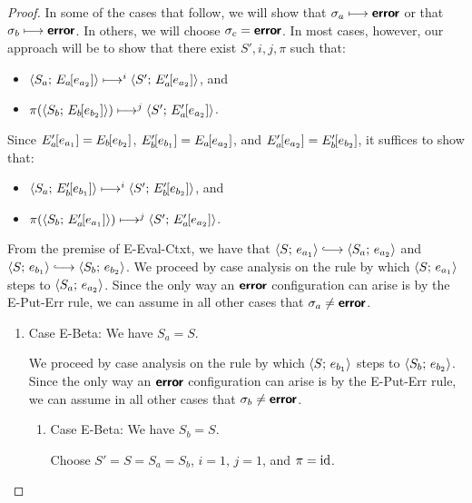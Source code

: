 \begin{proof}
  In some of the cases that follow, we will show that $\sigma_a
  \longmapsto \textbf{\textsf{error}}$ or that $\sigma_b \longmapsto \textbf{\textsf{error}}$.  In
  others, we will choose $\sigma_c = \textbf{\textsf{error}}$.  In most cases, however,
  our approach will be to show that there exist $S', i, j, \pi$ such
  that:
  \begin{itemize}
  \item $\langle S_a;\, E_a\hspace{-1mm}\left[e_{a_2}\right] \rangle \longmapsto^i
    \langle S';\, E'_a\hspace{-1mm}\left[e_{a_2}\right] \rangle$, and
  \item $\pi(\langle S_b;\, E_b\hspace{-1mm}\left[e_{b_2}\right] \rangle) \longmapsto^j
    \langle S';\, E'_a\hspace{-1mm}\left[e_{a_2}\right] \rangle$.
  \end{itemize}
  Since $E'_a\hspace{-1mm}\left[e_{a_1}\right] = E_b\hspace{-1mm}\left[e_{b_2}\right]$,
  $E'_b\hspace{-1mm}\left[e_{b_1}\right] = E_a\hspace{-1mm}\left[e_{a_2}\right]$, and
  $E'_a\hspace{-1mm}\left[e_{a_2}\right] = E'_b\hspace{-1mm}\left[e_{b_2}\right]$, it suffices
  to show that:
  \begin{itemize}
  \item $\langle S_a;\, E'_b\hspace{-1mm}\left[e_{b_1}\right] \rangle \longmapsto^i
    \langle S';\, E'_b\hspace{-1mm}\left[e_{b_2}\right] \rangle$, and
  \item $\pi(\langle S_b;\, E'_a\hspace{-1mm}\left[e_{a_1}\right] \rangle) \longmapsto^j
    \langle S';\, E'_a\hspace{-1mm}\left[e_{a_2}\right] \rangle$.
  \end{itemize}

  From the premise of {\sc E-Eval-Ctxt}, we have that
  $\config{S}{e_{a_1}} \parstepsto \config{S_a}{e_{a_2}}$ and
  $\config{S}{e_{b_1}} \parstepsto \config{S_b}{e_{b_2}}$.  We proceed
  by case analysis on the rule by which $\langle S;\, e_{a_1} \rangle$ steps to
  $\langle S_a;\, e_{a_2} \rangle$.  Since the only way an $\textbf{\textsf{error}}$
  configuration can arise is by the {\sc E-Put-Err} rule, we can
  assume in all other cases that $\sigma_a \neq \textbf{\textsf{error}}$.

  \begin{enumerate}
  \item Case {\sc E-Beta}: We have $S_a = S$.

    We proceed by case analysis on the rule by which
    $\langle S;\, e_{b_1} \rangle$ steps to $\langle S_b;\, e_{b_2} \rangle$.  Since the
    only way an $\textbf{\textsf{error}}$ configuration can arise is by the {\sc
      E-Put-Err} rule, we can assume in all other cases that $\sigma_b
    \neq \textbf{\textsf{error}}$.
    \begin{enumerate}
    \item \label{slqc-beta-beta}Case {\sc E-Beta}: We have $S_b =
      S$.

      Choose $S' = S = S_a = S_b$, $i = 1$, $j = 1$, and $\pi = \mathrm{id}$.


\end{enumerate}
\end{enumerate}
\end{proof}
